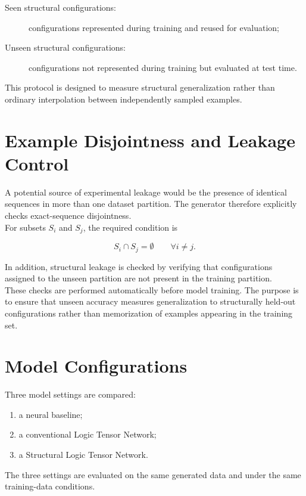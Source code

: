 \begin{description}
\item[Seen structural configurations:]
configurations represented during training and reused for evaluation;
\item[Unseen structural configurations:]
configurations not represented during training but evaluated at test time.


\end{description}

\noindent
This protocol is designed to measure structural generalization rather than ordinary interpolation between independently sampled examples.

\section{Example Disjointness and Leakage Control}

\noindent
A potential source of experimental leakage would be the presence of identical sequences in more than one dataset partition. The generator therefore explicitly checks exact-sequence disjointness.
\\
For subsets $S_i$ and $S_j$, the required condition is

$$
S_i \cap S_j = \emptyset
\qquad
\forall i \neq j.
$$

\noindent
In addition, structural leakage is checked by verifying that configurations assigned to the unseen partition are not present in the training partition.
\\
These checks are performed automatically before model training. The purpose is to ensure that unseen accuracy measures generalization to structurally held-out configurations rather than memorization of examples appearing in the training set.

\section{Model Configurations}

\noindent
Three model settings are compared:

\begin{enumerate}
\item a neural baseline;
\item a conventional Logic Tensor Network;
\item a Structural Logic Tensor Network.
\end{enumerate}

\noindent
The three settings are evaluated on the same generated data and under the same training-data conditions.

